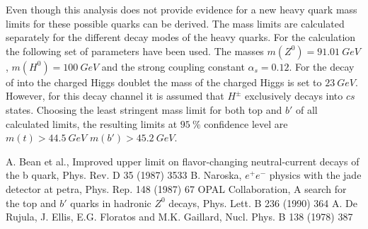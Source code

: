 \documentclass[11pt, twocolumn, a4paper]{article}
\begin{document}
Even though this analysis does not provide evidence for a new heavy quark mass limits for these possible quarks can be derived.
The mass limits are calculated separately for the different decay modes of the heavy quarks.
For the calculation the following set of parameters have been used.
The masses ${m(Z^0)=\SI{91.01}{GeV}}$, ${m(H^0) = \SI{100}{GeV}}$ and the strong coupling constant ${\alpha_s=0.12}$.
For the decay of into the charged Higgs doublet the mass of the charged Higgs is set to $\SI{23}{GeV}$.
However, for this decay channel it is assumed that $H^\pm$ exclusively decays into $cs$ states.
Choosing the least stringent mass limit for both top and $b'$ of all calculated limits, the resulting limits at $\SI{95}{\%}$ confidence level are ${m(t) > \SI{44.5}{GeV}}$ ${m(b') > \SI{45.2}{GeV}}$.\\


\begin{thebibliography}{99}
 A. Bean et al., Improved upper limit on flavor-changing neutral-current decays of the b quark, Phys. Rev. D 35 (1987) 3533
 B. Naroska, $e^+e^-$ physics with the jade detector at petra, Phys. Rep. 148 (1987) 67
 OPAL Collaboration, A search for the top and $b'$ quarks in hadronic $Z^0$ decays, Phys. Lett. B 236 (1990) 364
 A. De Rujula, J. Ellis, E.G. Floratos and M.K. Gaillard, Nucl.
Phys. B 138 (1978) 387
\end{thebibliography}
\end{document}
